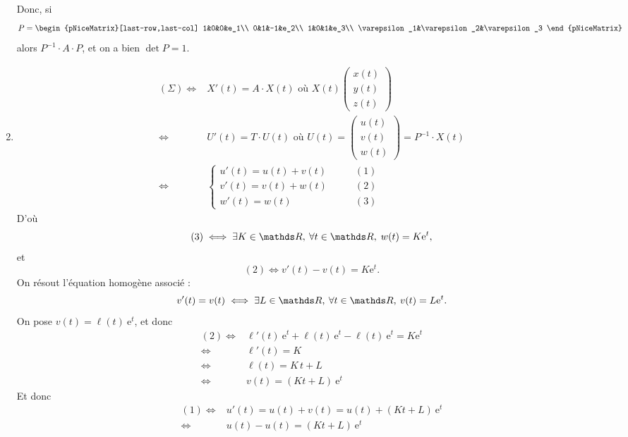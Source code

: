 \documentclass[a4paper]{article}
\begin{document}
\begin{enumerate}
			Donc, si \[
				P =
				\begin{pNiceMatrix}[last-row,last-col]
					1&0&0&e_1\\
					0&1&-1&e_2\\
					1&0&1&e_3\\
					\varepsilon_1&\varepsilon_2&\varepsilon_3
				\end{pNiceMatrix}
			\] alors $P^{-1} \cdot A \cdot P$, et on a bien $\det P = 1$.
		\item
			\begin{align*}
				(\Sigma) \iff& X'(t) = A\cdot X(t) \text{ où } X(t) \begin{pmatrix}
					x(t)\\y(t)\\z(t)
				\end{pmatrix}\\
				\iff& U'(t) = T\cdot U(t) \text{ où } U(t) = \begin{pmatrix}
						u(t)\\v(t)\\w(t)
					\end{pmatrix} = P^{-1}\cdot X(t)\\
				\iff& \begin{cases}
					u'(t) = u(t) + v(t)&\qquad(1)\\
					v'(t) = v(t) + w(t)&\qquad(2)\\
					w'(t) = w(t) &\qquad(3)
				\end{cases}
			\end{align*}
			D'où
			\[
				(3) \iff \exists K \in \R,\:\forall t \in \R,\;w(t) = K\mathrm{e}^{t},
			\] et \[
				(2) \iff v'(t) - v(t) = K \mathrm{e}^{t}
			.\]
			On résout l'équation homogène associé : \[
				v'(t) = v(t) \iff \exists L \in \R,\:\forall t \in \R,\:v(t) = L\mathrm{e}^{t}
			.\]
			On pose $v(t) = \ell(t)\:\mathrm{e}^{t}$, et donc
			\begin{align*}
				(2) \iff& \ell'(t)\:\mathrm{e}^{t} + \ell(t)\:\mathrm{e}^{t} - \ell(t)\:\mathrm{e}^{t} = K\mathrm{e}^t\\
				\iff& \ell'(t) = K\\
				\iff& \ell(t) = K\,t + L\\
				\iff& v(t) = (K t + L)\: \mathrm{e}^{t}
			\end{align*}
			Et donc
			\begin{align*}
				(1) \iff& u'(t) = u(t) + v(t) = u(t) + (Kt + L)\:\mathrm{e}^{t}\\
				\iff& u(t) - u(t) = (Kt + L)\:\mathrm{e}^{t}\\

\end{align*}
\end{enumerate}
\end{document}
